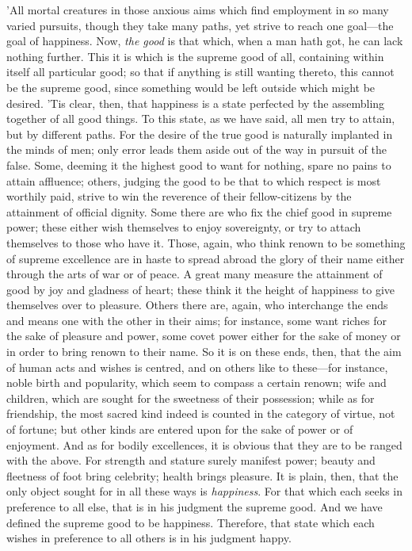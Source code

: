 'All mortal creatures in those anxious aims which find employment in so
many varied pursuits, though they take many paths, yet strive to reach
one goal—the goal of happiness. Now, \emph{the good} is that which, when a
man hath got, he can lack nothing further. This it is which is the
supreme good of all, containing within itself all particular good; so
that if anything is still wanting thereto, this cannot be the supreme
good, since something would be left outside which might be desired. 'Tis
clear, then, that happiness is a state perfected by the assembling
together of all good things. To this state, as we have said, all men try
to attain, but by different paths. For the desire of the true good is
naturally implanted in the minds of men; only error leads them aside out
of the way in pursuit of the false. Some, deeming it the highest good to
want for nothing, spare no pains to attain affluence; others, judging
the good to be that to which respect is most worthily paid, strive to
win the reverence of their fellow-citizens by the attainment of official
dignity. Some there are who fix the chief good in supreme power; these
either wish themselves to enjoy sovereignty, or try to attach themselves
to those who have it. Those, again, who think renown to be something of
supreme excellence are in haste to spread abroad the glory of their name
either through the arts of war or of peace. A great many measure the
attainment of good by joy and gladness of heart; these think it the
height of happiness to give themselves over to pleasure. Others there
are, again, who interchange the ends and means one with the other in
their aims; for instance, some want riches for the sake of pleasure and
power, some covet power either for the sake of money or in order to
bring renown to their name. So it is on these ends, then, that the aim
of human acts and wishes is centred, and on others like to these—for
instance, noble birth and popularity, which seem to compass a certain
renown; wife and children, which are sought for the sweetness of their
possession; while as for friendship, the most sacred kind indeed is
counted in the category of virtue, not of fortune; but other kinds are
entered upon for the sake of power or of enjoyment. And as for bodily
excellences, it is obvious that they are to be ranged with the above.
For strength and stature surely manifest power; beauty and fleetness of
foot bring celebrity; health brings pleasure. It is plain, then, that
the only object sought for in all these ways is \emph{happiness}. For that
which each seeks in preference to all else, that is in his judgment the
supreme good. And we have defined the supreme good to be happiness.
Therefore, that state which each wishes in preference to all others is
in his judgment happy.

